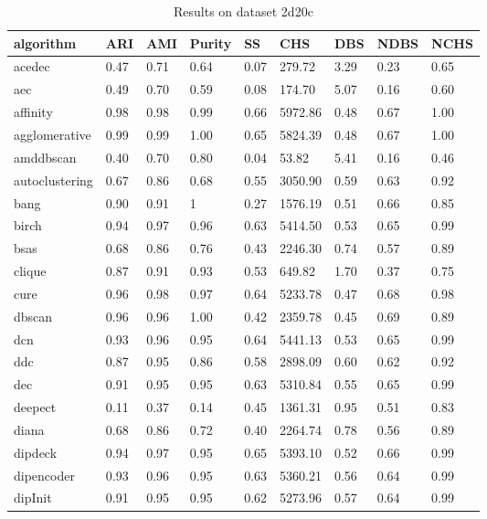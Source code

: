 \begin{table}[H]
\centering
\caption{Results on dataset 2d20c}
\label{S51_Table}
\begin{tabular}{|l|l|l|l|l|l|l|l|l|}
\hline
algorithm & ARI & AMI & Purity & SS & CHS & DBS & NDBS & NCHS \\
\hline
acedec & 0.47 & 0.71 & 0.64 & 0.07 & 279.72 & 3.29 & 0.23 & 0.65 \\
\hline
aec & 0.49 & 0.70 & 0.59 & 0.08 & 174.70 & 5.07 & 0.16 & 0.60 \\
\hline
affinity & 0.98 & 0.98 & 0.99 & 0.66 & 5972.86 & 0.48 & 0.67 & 1.00 \\
\hline
agglomerative & 0.99 & 0.99 & 1.00 & 0.65 & 5824.39 & 0.48 & 0.67 & 1.00 \\
\hline
amddbscan & 0.40 & 0.70 & 0.80 & 0.04 & 53.82 & 5.41 & 0.16 & 0.46 \\
\hline
autoclustering & 0.67 & 0.86 & 0.68 & 0.55 & 3050.90 & 0.59 & 0.63 & 0.92 \\
\hline
bang & 0.90 & 0.91 & 1 & 0.27 & 1576.19 & 0.51 & 0.66 & 0.85 \\
\hline
birch & 0.94 & 0.97 & 0.96 & 0.63 & 5414.50 & 0.53 & 0.65 & 0.99 \\
\hline
bsas & 0.68 & 0.86 & 0.76 & 0.43 & 2246.30 & 0.74 & 0.57 & 0.89 \\
\hline
clique & 0.87 & 0.91 & 0.93 & 0.53 & 649.82 & 1.70 & 0.37 & 0.75 \\
\hline
cure & 0.96 & 0.98 & 0.97 & 0.64 & 5233.78 & 0.47 & 0.68 & 0.98 \\
\hline
dbscan & 0.96 & 0.96 & 1.00 & 0.42 & 2359.78 & 0.45 & 0.69 & 0.89 \\
\hline
dcn & 0.93 & 0.96 & 0.95 & 0.64 & 5441.13 & 0.53 & 0.65 & 0.99 \\
\hline
ddc & 0.87 & 0.95 & 0.86 & 0.58 & 2898.09 & 0.60 & 0.62 & 0.92 \\
\hline
dec & 0.91 & 0.95 & 0.95 & 0.63 & 5310.84 & 0.55 & 0.65 & 0.99 \\
\hline
deepect & 0.11 & 0.37 & 0.14 & 0.45 & 1361.31 & 0.95 & 0.51 & 0.83 \\
\hline
diana & 0.68 & 0.86 & 0.72 & 0.40 & 2264.74 & 0.78 & 0.56 & 0.89 \\
\hline
dipdeck & 0.94 & 0.97 & 0.95 & 0.65 & 5393.10 & 0.52 & 0.66 & 0.99 \\
\hline
dipencoder & 0.93 & 0.96 & 0.95 & 0.63 & 5360.21 & 0.56 & 0.64 & 0.99 \\
\hline
dipInit & 0.91 & 0.95 & 0.95 & 0.62 & 5273.96 & 0.57 & 0.64 & 0.99 \\

\end{tabular}
\end{table}
